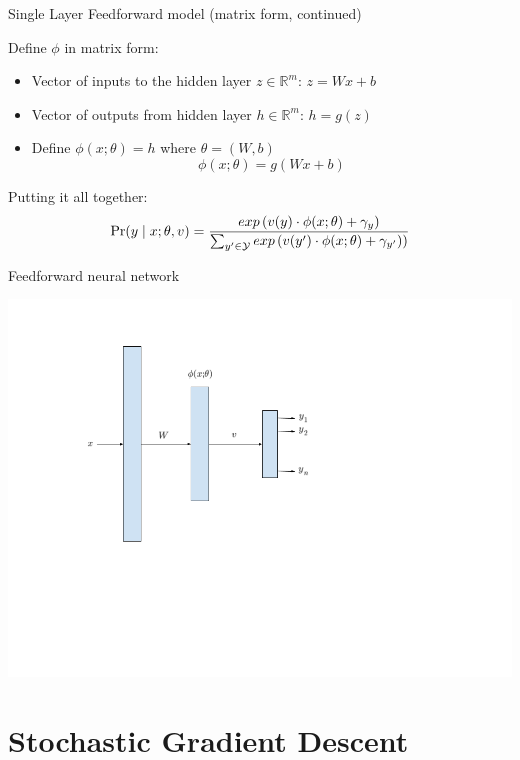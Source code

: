 \begin{frame}{Single Layer Feedforward model (matrix form, continued)}
\begin{block}{Define $\phi$ in matrix form:}
\begin{itemize}[<+->]
\item Vector of inputs to the hidden layer $z \in \mathbb{R}^m$: $z = Wx + b$
\item Vector of outputs from hidden layer $h \in \mathbb{R}^m$: $h = g(z)$
\item Define $\phi(x; \theta) = h$ where $\theta = (W, b)$
\[ \phi(x; \theta) = g(Wx + b) \]
\end{itemize}
\end{block}
\pause
\begin{block}{Putting it all together:}
\[ \Pr(y \mid x; \theta, v) = \frac{exp\left(v(y) \cdot \phi(x;\theta) + \gamma_y \right)}{\sum_{y' \in {\cal Y}} exp\left(v(y') \cdot \phi(x;\theta) + \gamma_{y'})\right)} \]
\end{block}

\end{frame}

\begin{frame}{Feedforward neural network}
\begin{block}{}
\centering
\includegraphics[scale=0.4]{figures/ffnet.png}
\end{block}
\end{frame}

\section{Stochastic Gradient Descent}
\frame{\tableofcontents[currentsection]}

